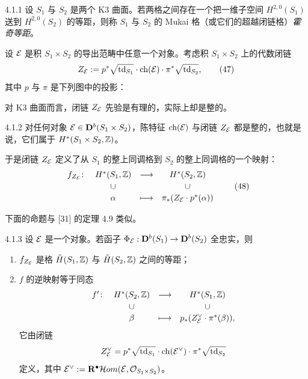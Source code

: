 \begin{definition}{4.1.1}
设 $S_1$ 与 $S_2$ 是两个 K3 曲面。若两格之间存在一个把一维子空间 $H^{2,0}(S_1)$ 送到 $H^{2,0}(S_2)$ 的等距，则称 $S_1$ 与 $S_2$ 的 Mukai 格（或它们的超越闭链格）\emph{霍奇等距}。
\end{definition}

设 $\mathcal{E}$ 是积 $S_1\times S_2$ 的导出范畴中任意一个对象。考虑积 $S_1\times S_2$ 上的代数闭链
\begin{equation}
Z_{\mathcal{E}}:=p^*\sqrt{\operatorname{td}_{S_1}}\cdot\operatorname{ch}(\mathcal{E})\cdot\pi^*\sqrt{\operatorname{td}_{S_2}},\tag{47}
\end{equation}
其中 $p$ 与 $\pi$ 是下列图中的投影：

对 K3 曲面而言，闭链 $Z_{\mathcal{E}}$ 先验是有理的，实际上却是整的。

\begin{lemma}[{{[}31{]}}]{4.1.2}
对任何对象 $\mathcal{E}\in\mathbf{D}^{b}(S_1\times S_2)$，陈特征 $\operatorname{ch}(\mathcal{E})$ 与闭链 $Z_{\mathcal{E}}$ 都是整的，也就是说，它们属于 $H^*(S_1\times S_2,\mathbb{Z})$。
\end{lemma}

于是闭链 $Z_{\mathcal{E}}$ 定义了从 $S_1$ 的整上同调格到 $S_2$ 的整上同调格的一个映射：
\begin{equation}
\begin{array}{rccc}
f_{Z_{\mathcal{E}}}\colon & H^*(S_1,\mathbb{Z}) & \longrightarrow & H^*(S_2,\mathbb{Z})\\[2pt]
& \cup & & \cup\\[2pt]
& \alpha & \longmapsto & \pi_*(Z_{\mathcal{E}}\cdot p^*(\alpha))
\end{array}\tag{48}
\end{equation}

下面的命题与 [31] 的定理 4.9 类似。

\begin{proposition}{4.1.3}
设 $\mathcal{E}$ 是一个对象。若函子 $\Phi_{\mathcal{E}}:\mathbf{D}^{b}(S_1)\to\mathbf{D}^{b}(S_2)$ 全忠实，则
\begin{enumerate}[label=\arabic*),leftmargin=2.4em,itemsep=1pt,topsep=2pt]
\item $f_{Z_{\mathcal{E}}}$ 是格 $\tilde H(S_1,\mathbb{Z})$ 与 $\tilde H(S_2,\mathbb{Z})$ 之间的等距；
\item $f$ 的逆映射等于同态
\begin{equation*}
\begin{array}{rccc}
f'\colon & H^*(S_2,\mathbb{Z}) & \longrightarrow & H^*(S_1,\mathbb{Z})\\[2pt]
& \cup & & \cup\\[2pt]
& \beta & \longmapsto & p_*(Z_{\mathcal{E}}^{\vee}\cdot\pi^*(\beta)),
\end{array}
\end{equation*}
它由闭链
\begin{equation*}
Z_{\mathcal{E}}^{\vee}=p^*\sqrt{\operatorname{td}_{S_1}}\cdot\operatorname{ch}(\mathcal{E}^{\vee})\cdot\pi^*\sqrt{\operatorname{td}_{S_2}}
\end{equation*}
定义，其中 $\mathcal{E}^{\vee}:=\mathbf{R}^{\bullet}\mathcal{H} om(\mathcal{E},\mathcal{O}_{S_1\times S_2})$。
\end{enumerate}
\end{proposition}

